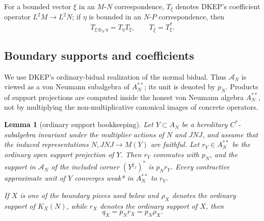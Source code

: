 \documentclass[12pt]{article}
\newtheorem{lemma}{Lemma}
\newcommand{\cA}{\mathcal A}
\begin{document}
For a bounded vector \(\xi\) in an \(M\)-\(N\) correspondence, \(T_\xi\) denotes
DKEP's coefficient operator \(L^2M\to L^2N\); if \(\eta\) is bounded in an
\(N\)-\(P\) correspondence, then
\[
        T_{\xi\otimes_N\eta}=T_\eta T_\xi,\qquad
        T_{\bar\xi}=T_\xi^* .                                    \tag{1}
\]

\subsection*{Boundary supports and coefficients}

We use DKEP's ordinary-bidual realization of the normal bidual.  Thus
\(\cA_N\) is viewed as a von Neumann subalgebra of \(A_N^{**}\); its unit is
denoted by \(p_N\).  Products of support projections are computed inside the
honest von Neumann algebra \(A_N^{**}\), not by multiplying the
non-multiplicative canonical images of concrete operators.

\begin{lemma}[ordinary support bookkeeping]\label{lem:support}
Let \(Y\subset A_N\) be a hereditary \(C^*\)-subalgebra invariant under the
multiplier actions of \(N\) and \(JNJ\), and assume that the induced
representations \(N,JNJ\to M(Y)\) are faithful.  Let \(r_Y\in A_N^{**}\) be
the ordinary open support projection of \(Y\).  Then \(r_Y\) commutes with
\(p_N\), and the support in \(\cA_N\) of the included corner
\((Y^{\sharp_J})^*\) is \(p_Nr_Y\).  Every contractive approximate unit of
\(Y\) converges weak* in \(A_N^{**}\) to \(r_Y\).

If \(X\) is one of the boundary pieces used below and \(\rho_X\) denotes the
ordinary support of \(K_X(N)\), while \(r_X\) denotes the ordinary support of
\(X\), then
\[
        q_X=p_Nr_X=p_N\rho_X .                                    \tag{2}
\]
\end{lemma}
\end{document}
